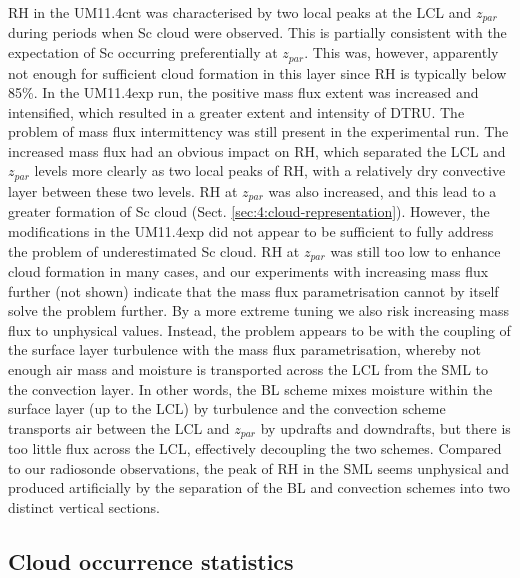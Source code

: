 RH in the UM11.4cnt was characterised by two local peaks at the LCL and $z_{par}$
during periods when Sc cloud were observed. This is partially consistent
with the expectation of Sc occurring preferentially at $z_{par}$. This was, however, apparently not enough for sufficient cloud formation in this layer since RH is typically below 85\%.
In the UM11.4exp run, the positive mass flux extent was increased and intensified,
which resulted in a greater extent and intensity of DTRU. The problem of
mass flux intermittency was still present in the experimental run. The increased
mass flux had an obvious impact on RH, which separated the LCL and $z_{par}$
levels more clearly as two local peaks of RH, with a relatively dry
convective layer between these two levels. RH at $z_{par}$ was also increased,
and this lead to a greater formation of Sc cloud (Sect.
\ref{sec:4:cloud-representation}).  %
However, the modifications in the UM11.4exp
did not appear to be sufficient to fully address the problem of underestimated
Sc cloud. RH at $z_{par}$ was still too low to enhance cloud formation in many cases, and our experiments with
increasing mass flux further (not shown) indicate that the mass flux
parametrisation cannot by itself solve the problem further. By a more extreme
tuning we also risk increasing mass flux to unphysical values.
Instead, the problem appears to be with the coupling of the surface layer
turbulence with the mass flux parametrisation, whereby not enough air mass
and moisture is transported across the LCL from the SML to the convection layer. In
other words, the BL scheme mixes moisture within the surface layer (up to the LCL)
by turbulence and the convection scheme transports air between the LCL and
$z_{par}$ by updrafts and downdrafts, but there is too little flux across the LCL,
effectively decoupling the two schemes. Compared to our
radiosonde observations, the peak of RH in the SML seems unphysical and
produced artificially by the separation of the BL and convection schemes
into two distinct vertical sections.


\subsection{Cloud occurrence statistics}
\label{sec:4:cloud-occurrence-statistics}


